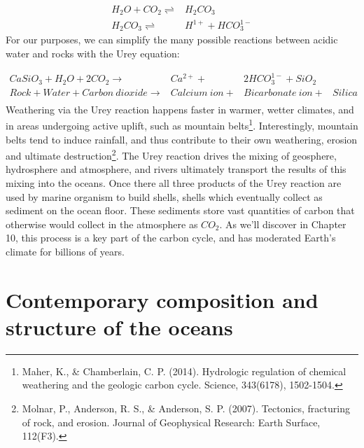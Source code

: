 \begin{align} \label{eq:carbonic}
	H_2O+CO_2 \rightleftharpoons & H_2CO_3\\
	H_2CO_3  \rightleftharpoons & H^{1+} + HCO_3^{1-}
\end{align}
For our purposes, we can simplify the many possible reactions between acidic water and rocks with the Urey equation:

\begin{align} \label{eq:urey}
	CaSiO_3 + H_2O + 2CO_2  \rightarrow & Ca^{2+} + & 2HCO_3^{1-} + SiO_2\\
	Rock + Water + Carbon\ dioxide \rightarrow & Calcium\ ion + &  Bicarbonate\ ion  + & Silica \\
\end{align}
Weathering via the Urey reaction happens faster in warmer, wetter climates, and in areas undergoing active uplift, such as mountain belts\footnote{Maher, K., \& Chamberlain, C. P. (2014). Hydrologic regulation of chemical weathering and the geologic carbon cycle. Science, 343(6178), 1502-1504.}. Interestingly, mountain belts tend to induce rainfall, and thus contribute to their own weathering, erosion and ultimate destruction\footnote{Molnar, P., Anderson, R. S., \& Anderson, S. P. (2007). Tectonics, fracturing of rock, and erosion. Journal of Geophysical Research: Earth Surface, 112(F3).}.  The Urey reaction drives the mixing of geosphere, hydrosphere and atmosphere, and rivers ultimately transport the results of this mixing into the oceans. Once there all three products of the Urey reaction are used by marine organism to build shells, shells which eventually collect as sediment on the ocean floor. These sediments store vast quantities of carbon that otherwise would collect in the atmosphere as $CO_2$. As we'll discover in Chapter 10, this process is a key part of the carbon cycle, and has moderated Earth's climate for billions of years.

\section{Contemporary composition and structure of the oceans}

